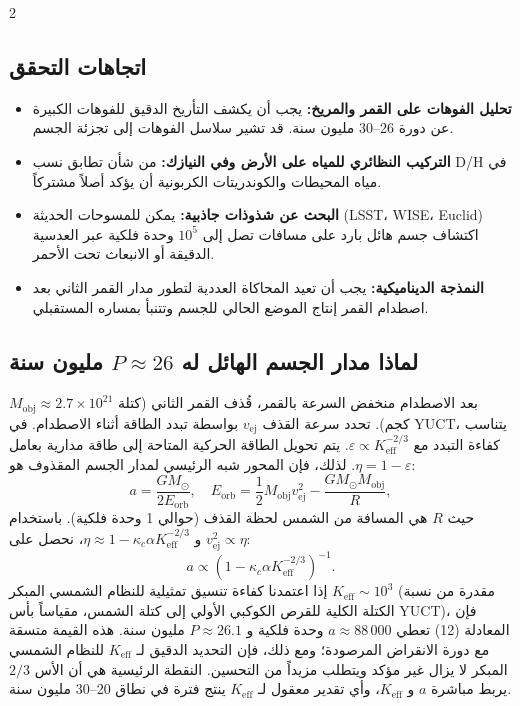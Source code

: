 \documentclass[11pt,a4paper]{article}
\begin{document}
\begin{multicols}{2}
		\subsection{اتجاهات التحقق}
		\begin{itemize}
			\item \textbf{تحليل الفوهات على القمر والمريخ:} يجب أن يكشف التأريخ الدقيق للفوهات الكبيرة عن دورة 26–30 مليون سنة. قد تشير سلاسل الفوهات إلى تجزئة الجسم.
			\item \textbf{التركيب النظائري للمياه على الأرض وفي النيازك:} من شأن تطابق نسب D/H في مياه المحيطات والكوندريتات الكربونية أن يؤكد أصلاً مشتركاً.
			\item \textbf{البحث عن شذوذات جاذبية:} يمكن للمسوحات الحديثة (LSST، WISE، Euclid) اكتشاف جسم هائل بارد على مسافات تصل إلى \(10^5\) وحدة فلكية عبر العدسية الدقيقة أو الانبعاث تحت الأحمر.
			\item \textbf{النمذجة الديناميكية:} يجب أن تعيد المحاكاة العددية لتطور مدار القمر الثاني بعد اصطدام القمر إنتاج الموضع الحالي للجسم وتتنبأ بمساره المستقبلي.
		\end{itemize}
		
		\subsection{لماذا مدار الجسم الهائل له \(P \approx 26\) مليون سنة}
		بعد الاصطدام منخفض السرعة بالقمر، قُذف القمر الثاني (كتلة \(M_{\text{obj}} \approx 2.7\times10^{21}\) كجم). تحدد سرعة القذف \(v_{\text{ej}}\) بواسطة تبدد الطاقة أثناء الاصطدام. في YUCT، يتناسب كفاءة التبدد مع \(\varepsilon \propto K_{\mathrm{eff}}^{-2/3}\). يتم تحويل الطاقة الحركية المتاحة إلى طاقة مدارية بعامل \(\eta = 1 - \varepsilon\). لذلك، فإن المحور شبه الرئيسي لمدار الجسم المقذوف هو:
		\[
		a = \frac{GM_{\odot}}{2E_{\text{orb}}}, \quad E_{\text{orb}} = \frac{1}{2} M_{\text{obj}} v_{\text{ej}}^2 - \frac{GM_{\odot}M_{\text{obj}}}{R},
		\]
		حيث \(R\) هي المسافة من الشمس لحظة القذف (حوالي 1 وحدة فلكية). باستخدام \(v_{\text{ej}}^2 \propto \eta\) و \(\eta \approx 1 - \kappa_c \alpha K_{\mathrm{eff}}^{-2/3}\)، نحصل على:
		\[
		a \propto \left(1 - \kappa_c \alpha K_{\mathrm{eff}}^{-2/3}\right)^{-1}.
		\]
		إذا اعتمدنا كفاءة تنسيق تمثيلية للنظام الشمسي المبكر \(K_{\mathrm{eff}} \sim 10^3\) (مقدرة من نسبة الكتلة الكلية للقرص الكوكبي الأولي إلى كتلة الشمس، مقياساً بأس YUCT)، فإن المعادلة (12) تعطي \(a \approx 88\,000\) وحدة فلكية و \(P \approx 26.1\) مليون سنة. هذه القيمة متسقة مع دورة الانقراض المرصودة؛ ومع ذلك، فإن التحديد الدقيق لـ \(K_{\mathrm{eff}}\) للنظام الشمسي المبكر لا يزال غير مؤكد ويتطلب مزيداً من التحسين. النقطة الرئيسية هي أن الأس \(2/3\) يربط مباشرة \(a\) و \(K_{\mathrm{eff}}\)، وأي تقدير معقول لـ \(K_{\mathrm{eff}}\) ينتج فترة في نطاق 20–30 مليون سنة.
		

\end{multicols}
\end{document}
